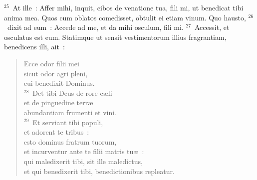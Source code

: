 ${}^{25}$~At ille~: Affer mihi, inquit, cibos de venatione tua, fili mi, ut benedicat tibi anima mea. Quos cum oblatos comedisset, obtulit ei etiam vinum. Quo hausto,
${}^{26}$~dixit ad eum~: Accede ad me, et da mihi osculum, fili mi.
${}^{27}$~Accessit, et osculatus est eum. Statimque ut sensit vestimentorum illius fragrantiam, benedicens illi, ait~: \begin{flushleft}\begin{verse}Ecce odor filii mei\\ sicut odor agri pleni,\\ cui benedixit Dominus.\\
${}^{28}$~Det tibi Deus de rore c\ae li\\ et de pinguedine terr\ae \\ abundantiam frumenti et vini.\\
${}^{29}$~Et serviant tibi populi,\\ et adorent te tribus~:\\ esto dominus fratrum tuorum,\\ et incurventur ante te filii matris tu\ae~:\\ qui maledixerit tibi, sit ille maledictus,\\ et qui benedixerit tibi, benedictionibus repleatur.\end{verse}\end{flushleft}


